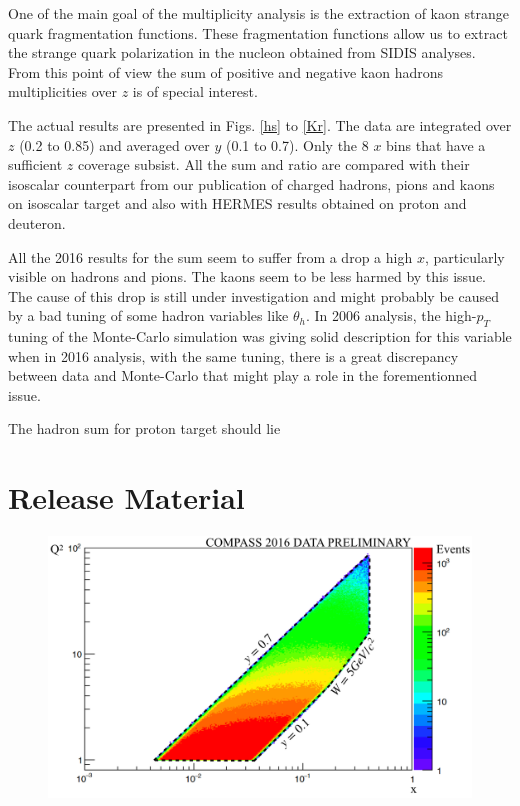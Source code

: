 \documentclass[letterpaper,12pt]{article}
\begin{document}
One of the main goal of the multiplicity analysis is the extraction of kaon strange quark fragmentation functions. These fragmentation functions allow us to extract the strange quark polarization in the nucleon obtained from SIDIS analyses. From this point of view the sum of positive and negative kaon hadrons multiplicities over $z$ is of special interest.

The actual results are presented in Figs. \ref{hs} to \ref{Kr}. The data are integrated over $z$ (0.2 to 0.85) and averaged over $y$ (0.1 to 0.7). Only the 8 $x$ bins that have a sufficient $z$ coverage subsist.
All the sum and ratio are compared with their isoscalar counterpart from our publication of charged hadrons, pions and kaons on isoscalar target and also with HERMES results obtained on proton and deuteron.

All the 2016 results for the sum seem to suffer from a drop a high $x$, particularly visible on hadrons and pions. The kaons seem to be less harmed by this issue. The cause of this drop is still under investigation and might probably be caused by a bad tuning of some hadron variables like $\theta_h$. In 2006 analysis, the high-$p_T$ tuning of the Monte-Carlo simulation was giving solid description for this variable when in 2016 analysis, with the same tuning, there is a great discrepancy between data and Monte-Carlo that might play a role in the forementionned issue.

The hadron sum for proton target should lie 

\newpage

\section{Release Material} \label{RM}

\begin{figure}[H]
	\centering
	\includegraphics[scale=0.34]{./gfx/xQ2.png}
	\caption{}
	\label{xQ2}
\end{figure}
\end{document}
